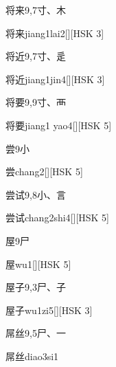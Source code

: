 \begin{entry}{将来}{9,7}{⼨、⽊}
  \begin{phonetics}{将来}{jiang1lai2}[][HSK 3]
  \end{phonetics}
\end{entry}

\begin{entry}{将近}{9,7}{⼨、⾡}
  \begin{phonetics}{将近}{jiang1jin4}[][HSK 3]
  \end{phonetics}
\end{entry}

\begin{entry}{将要}{9,9}{⼨、⾑}
  \begin{phonetics}{将要}{jiang1 yao4}[][HSK 5]
  \end{phonetics}
\end{entry}

\begin{entry}{尝}{9}{⼩}
  \begin{phonetics}{尝}{chang2}[][HSK 5]
  \end{phonetics}
\end{entry}

\begin{entry}{尝试}{9,8}{⼩、⾔}
  \begin{phonetics}{尝试}{chang2shi4}[][HSK 5]
  \end{phonetics}
\end{entry}

\begin{entry}{屋}{9}{⼫}
  \begin{phonetics}{屋}{wu1}[][HSK 5]
  \end{phonetics}
\end{entry}

\begin{entry}{屋子}{9,3}{⼫、⼦}
  \begin{phonetics}{屋子}{wu1zi5}[][HSK 3]
  \end{phonetics}
\end{entry}

\begin{entry}{屌丝}{9,5}{⼫、⼀}
  \begin{phonetics}{屌丝}{diao3si1}
  \end{phonetics}
\end{entry}

